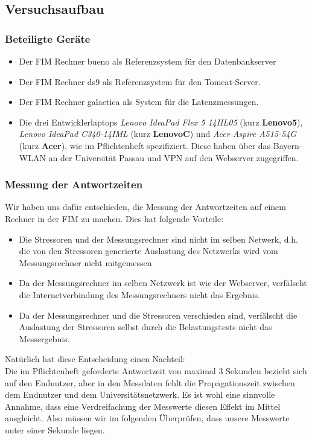 
\subsection{Versuchsaufbau}

\subsubsection{Beteiligte Geräte}
\begin{itemize}
	\item Der FIM Rechner bueno als Referenzsystem für den Datenbankserver
	\item Der FIM Rechner ds9 als Referenzsystem für den Tomcat-Server.
	\item Der FIM Rechner galactica als System für die Latenzmessungen.
	\item Die drei Entwicklerlaptops \emph{Lenovo IdeaPad Flex 5 14IIL05} (kurz \textbf{Lenovo5}), \emph{Lenovo IdeaPad C340-14IML} (kurz \textbf{LenovoC}) und \emph{Acer Aspire A515-54G} (kurz \textbf{Acer}), wie im Pflichtenheft spezifiziert. Diese haben über das Bayern-WLAN an der Universität Passau und VPN auf den Webserver zugegriffen.
\end{itemize}

\subsubsection{Messung der Antwortzeiten}\label{sec:mess}
Wir haben uns dafür entschieden, die Messung der Antwortzeiten auf einem Rechner in der FIM zu machen. Dies hat folgende Vorteile:
\begin{itemize}
	\item Die Stressoren und der Messungsrechner sind nicht im selben Netwerk, d.h. die von den Stressoren generierte Auslastung des Netzwerks wird vom Messungsrechner nicht mitgemessen
	\item Da der Messungsrechner im selben Netzwerk ist wie der Webserver, verfälscht die Internetverbindung des Messungsrechners nicht das Ergebnis.
	\item Da der Messungsrechner und die Stressoren verschieden sind, verfälscht die Auslastung der Stressoren selbst durch die Belastungstests nicht das Messergebnis.	
\end{itemize}
Natürlich hat diese Entscheidung einen Nachteil:\\
 Die im Pflichtenheft geforderte Antwortzeit von maximal 3 Sekunden bezieht sich auf den Endnutzer, aber in den Messdaten fehlt die Propagationszeit zwischen dem Endnutzer und dem Universitätsnetzwerk. Es ist wohl eine sinnvolle Annahme, dass eine Verdreifachung der Messwerte diesen Effekt im Mittel ausgleicht. Also müssen wir im folgenden Überprüfen, dass unsere Messwerte unter einer Sekunde liegen.


